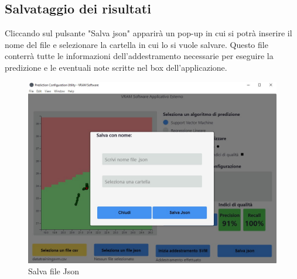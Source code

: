 	\subsection{Salvataggio dei risultati}
	Cliccando sul pulsante "Salva json" apparirà un pop-up in cui si potrà inserire il nome del file e selezionare la cartella in cui lo si vuole salvare. Questo file conterrà tutte le informazioni dell'addestramento necessarie per eseguire la predizione e le eventuali note scritte nel box dell'applicazione.
	\begin{figure}[H] 	
		\begin{center}
			\includegraphics[width=\linewidth]{img/10.jpg}
		\end{center}
		\caption{Salva file Json}	
	\end{figure}
	
